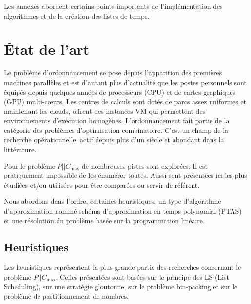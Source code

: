 \documentclass[a4paper,12pt]{report}
\theoremstyle{plain}				%
\theoremstyle{definition}				%
\newcommand\problemGrahamP{$P||C_{\max}$\xspace}
\newcommand{\lp}[1]{\todo[author=LP,color=yellow,inline]{#1}}
\begin{document}
Les annexes abordent certains points importants de l'implémentation des algorithmes et de la création des listes de temps.  

\section{\'{E}tat de l'art} \label{sec:etatDeLArt}

Le problème d'ordonnancement se pose depuis l'apparition des premières machines parallèles et 
  est d'autant plus d'actualité que les postes personnels sont équipés depuis quelques années 
  de processeurs (CPU) et de cartes graphiques (GPU) multi-c{\oe}urs.
Les centres de calculs sont dotés de parcs assez uniformes et maintenant 
  les clouds, offrent des instances VM qui permettent des environnements 
  d'exécution homogènes.     
L'ordonnancement fait partie de la catégorie des problèmes d'optimisation combinatoire. 
C'est un champ de la recherche opérationnelle, actif depuis plus d'un siècle 
  et abondant dans la littérature. 

Pour le problème \problemGrahamP de nombreuses pistes sont explorées. Il est pratiquement impossible de les énumérer toutes. 
Aussi sont présentées ici les plus étudiées et/ou utilisées pour être comparées ou servir de référent.
  
Nous abordons dans l'ordre, certaines heuristiques, un type d'algorithme d'approximation nommé schéma d'approximation en temps polynomial (PTAS) et une résolution du problème basée sur la programmation linéaire.

\subsection{Heuristiques}\label{ssec:Heuristiques}

Les heuristiques représentent la plus grande partie des recherches concernant le problème \problemGrahamP. 
Celles présentées sont basées 
  sur le principe des LS (List Scheduling), 
  sur une stratégie gloutonne,   
  sur le problème bin-packing et  
  sur le problème de partitionnement de nombres. 
\end{document}
